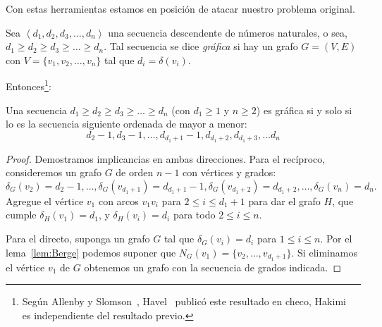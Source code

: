   Con estas herramientas
  estamos en posición de atacar nuestro problema original.
  \begin{definition}
    Sea \(\left\langle d_1, d_2, d_3, \dotsc, d_n \right\rangle\)
    una secuencia descendente de números naturales,
    o sea, \(d_1 \ge d_2 \ge d_3 \ge \dotso \ge d_n\).
    Tal secuencia se dice \emph{gráfica}
    si hay un grafo \(G = (V, E)\)
    con \(V = \{v_1, v_2, \dotsc, v_n\}\)
    tal que \(d_i = \delta(v_i)\).
  \end{definition}
  Entonces\footnote{%
    Según Allenby y Slomson~\cite[página~159]{allenby11:_how_count},
    Havel~\cite{havel55:_poznamka}
    publicó este resultado en checo,
    Hakimi~\cite{hakimi62:_realiz_set_int_degrees_vertices_linear_graph}
    es independiente del resultado previo.}:
  \begin{theorem}
    \label{theo:Havel}
    Una secuencia \(d_1 \ge d_2 \ge d_3 \ge \dotso \ge d_n\)
    (con  \(d_1 \ge 1\) y \(n \ge 2\))
    es gráfica si y solo si lo es la secuencia siguiente
    ordenada de mayor a menor:
    \begin{equation*}
      d_2 - 1, d_3 - 1, \dotsc, d_{d_1 + 1} - 1,
	d_{d_1 + 2}, d_{d_1 + 3}, \dotsc d_n
    \end{equation*}
  \end{theorem}
  \begin{proof}
    Demostramos implicancias en ambas direcciones.
    Para el recíproco,
    consideremos un grafo \(G\)
    de orden \(n - 1\) con vértices y grados:
    \begin{equation*}
      \delta_G(v_2) = d_2 - 1,
	\dotsc, \delta_G(v_{d_1 + 1}) = d_{d_1 + 1} - 1,
		   \delta_G(v_{d_1 + 2}) = d_{d_1 + 2},
	\dotsc, \delta_G(v_n) = d_n.
    \end{equation*}
    Agregue el vértice \(v_1\)
    con arcos \(v_1 v_i\) para \(2 \le i \le d_1 + 1\) para dar el grafo \(H\),
    que cumple \(\delta_H(v_1) = d_1\),
    y \(\delta_H(v_i) = d_i\) para todo \(2 \le i \le n\).

    Para el directo,
    suponga un grafo \(G\) tal que \(\delta_G(v_i) = d_i\)
    para \(1 \le i \le n\).
    Por el lema~\ref{lem:Berge}
    podemos suponer que \(N_G(v_1) = \{v_2, \dotsc, v_{d_1 + 1}\}\).
    Si eliminamos el vértice \(v_1\) de \(G\)
    obtenemos un grafo con la secuencia de grados indicada.
  \end{proof}

